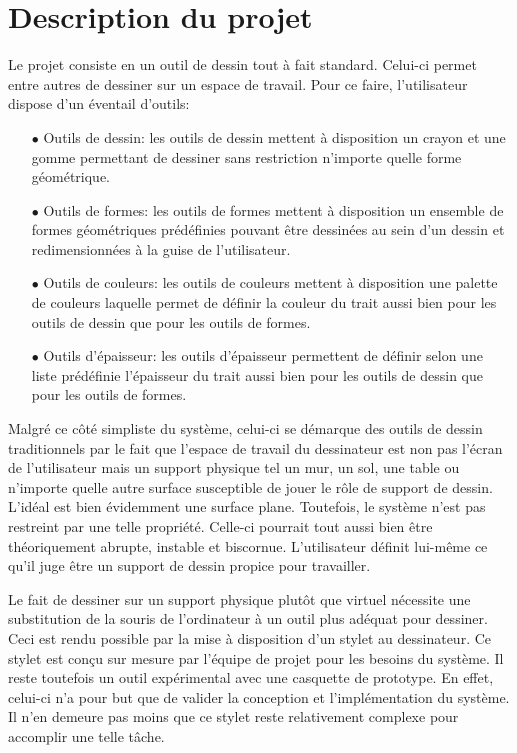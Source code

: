 \documentclass[11pt,a4paper,oldfontcommands]{memoir}
\begin{document}
\section{Description du projet}

Le projet consiste en un outil de dessin tout à fait standard. Celui-ci permet entre autres de dessiner sur un espace de travail. Pour ce faire, l'utilisateur dispose d'un éventail d'outils:

\begin{itemize}
\item[$\bullet$] Outils de dessin: les outils de dessin mettent à disposition un crayon et une gomme permettant de dessiner sans restriction n'importe quelle forme géométrique.
\item[$\bullet$] Outils de formes: les outils de formes mettent à disposition un ensemble de formes géométriques prédéfinies pouvant être dessinées au sein d'un dessin et redimensionnées à la guise de l'utilisateur.
\item[$\bullet$] Outils de couleurs: les outils de couleurs mettent à disposition une palette de couleurs laquelle permet de définir la couleur du trait aussi bien pour les outils de dessin que pour les outils de formes.
\item[$\bullet$] Outils d'épaisseur: les outils d'épaisseur permettent de définir selon une liste prédéfinie l'épaisseur du trait aussi bien pour les outils de dessin que pour les outils de formes.
\end{itemize}

Malgré ce côté simpliste du système, celui-ci se démarque des outils de dessin traditionnels par le fait que l'espace de travail du dessinateur est non pas l'écran de l'utilisateur mais un support physique tel un mur, un sol, une table ou n'importe quelle autre surface susceptible de jouer le rôle de support de dessin. L'idéal est bien évidemment une surface plane. Toutefois, le système n'est pas restreint par une telle propriété. Celle-ci pourrait tout aussi bien être théoriquement abrupte, instable et biscornue. L'utilisateur définit lui-même ce qu'il juge être un support de dessin propice pour travailler.

\newpage

Le fait de dessiner sur un support physique plutôt que virtuel nécessite une substitution de la souris de l'ordinateur à un outil plus adéquat pour dessiner. Ceci est rendu possible par la mise à disposition d'un stylet au dessinateur. Ce stylet est conçu sur mesure par l'équipe de projet pour les besoins du système. Il reste toutefois un outil expérimental avec une casquette de prototype. En effet, celui-ci n'a pour but que de valider la conception et l'implémentation du système. Il n'en demeure pas moins que ce stylet reste relativement complexe pour accomplir une telle tâche.
\end{document}
